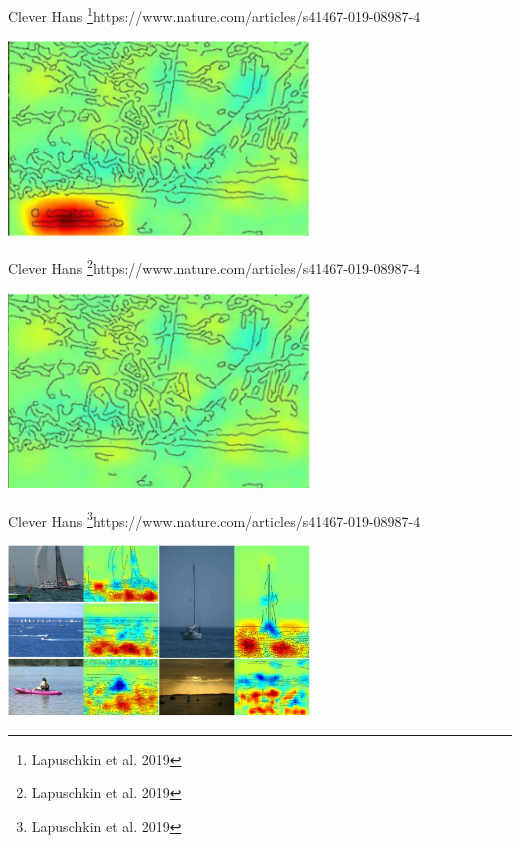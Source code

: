 \documentclass[11pt,compress,t,notes=noshow, xcolor=table]{beamer}
\begin{document}
\begin{vbframe}{Clever Hans \footnote{Lapuschkin et al. 2019}{https://www.nature.com/articles/s41467-019-08987-4}}
	
	\centering
	\includegraphics[width=0.6\textwidth]{figure/horse_map_with_label.PNG}
	
\end{vbframe}

\begin{vbframe}{Clever Hans \footnote{Lapuschkin et al. 2019}{https://www.nature.com/articles/s41467-019-08987-4}}
	
	\centering
	\includegraphics[width=0.6\textwidth]{figure/horse_map_without_label.PNG}
	
\end{vbframe}

\begin{vbframe}{Clever Hans \footnote{Lapuschkin et al. 2019}{https://www.nature.com/articles/s41467-019-08987-4}}
	
	\centering
	\includegraphics[width=0.6\textwidth]{figure/boats_maps.PNG}
	
\end{vbframe}
\end{document}
